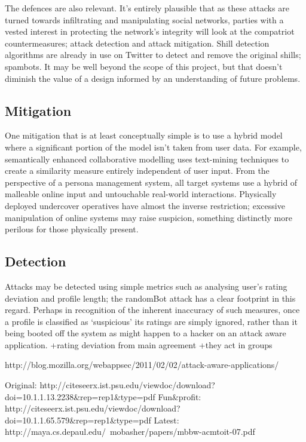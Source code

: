 The defences are also relevant. It’s entirely plausible that as these attacks are turned towards infiltrating and manipulating social networks, parties with a vested interest in protecting the network’s integrity will look at the compatriot countermeasures; attack detection and attack mitigation. Shill detection algorithms are already in use on Twitter to detect and remove the original shills; spambots. It may be well beyond the scope of this project, but that doesn’t diminish the value of a design informed by an understanding of future problems.

\subsection{Mitigation}

One mitigation that is at least conceptually simple  is to use a hybrid model where a significant portion of the model isn’t taken from user data. For example, semantically enhanced collaborative modelling uses text-mining techniques to create a similarity measure entirely independent of user input. From the perspective of a persona management system, all target systems use a hybrid of malleable online input and untouchable real-world interactions. Physically deployed undercover operatives have almost the inverse restriction; excessive manipulation of online systems may raise suspicion, something distinctly more perilous for those physically present.

\subsection{Detection}
Attacks may be detected using simple metrics such as analysing user’s rating deviation and profile length; the randomBot attack has a clear footprint in this regard. Perhaps in recognition of the inherent inaccuracy of such measures, once a profile is classified as `suspicious' its ratings are simply ignored, rather than it being booted off the system as might happen to a hacker on an attack aware application.
+rating deviation from main agreement
+they act in groups


http://blog.mozilla.org/webappsec/2011/02/02/attack-aware-applications/

Original: http://citeseerx.ist.psu.edu/viewdoc/download?doi=10.1.1.13.2238\&rep=rep1\&type=pdf
Fun\&profit: http://citeseerx.ist.psu.edu/viewdoc/download?doi=10.1.1.65.579\&rep=rep1\&type=pdf
Latest: http://maya.cs.depaul.edu/~mobasher/papers/mbbw-acmtoit-07.pdf